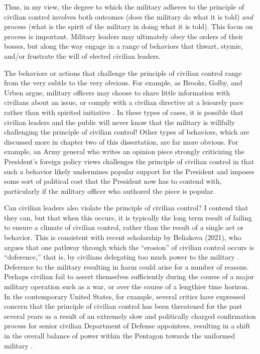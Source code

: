 \documentclass[
  12pt,
  oneside]{memoir}
\begin{document}
Thus, in my view, the degree to which the military adheres to the principle of civilian control involves both outcomes (does the military do what it is told) \emph{and} process (what is the spirit of the military in doing what it is told). This focus on process is important. Military leaders may ultimately obey the orders of their bosses, but along the way engage in a range of behaviors that thwart, stymie, and/or frustrate the will of elected civilian leaders.

The behaviors or actions that challenge the principle of civilian control range from the very subtle to the very obvious. For example, as Brooks, Golby, and Urben argue, military officers may choose to share little information with civilians about an issue, or comply with a civilian directive at a leisurely pace rather than with spirited initiative \autocite{brooks_crisis_2021}. In these types of cases, it is possible that civilian leaders and the public will never know that the military is willfully challenging the principle of civilian control! Other types of behaviors, which are discussed more in chapter two of this dissertation, are far more obvious. For example, an Army general who writes an opinion piece strongly criticizing the President's foreign policy views challenges the principle of civilian control in that such a behavior likely undermines popular support for the President and imposes some sort of political cost that the President now has to contend with, particularly if the military officer who authored the piece is popular.

Can civilian leaders also violate the principle of civilian control? I contend that they can, but that when this occurs, it is typically the long term result of failing to ensure a climate of civilian control, rather than the result of a single act or behavior. This is consistent with recent scholarship by Beliakova (2021), who argues that one pathway through which the ``erosion'' of civilian control occurs is ``deference,'' that is, by civilians delegating too much power to the military \autocite{beliakova_erosion_2021}. Deference to the military resulting in harm could arise for a number of reasons. Perhaps civilian fail to assert themselves sufficiently during the course of a major military operation such as a war, or over the course of a lengthier time horizon. In the contemporary United States, for example, several critics have expressed concern that the principle of civilian control has been threatened for the past several years as a result of an extremely slow and politically charged confirmation process for senior civilian Department of Defense appointees, resulting in a shift in the overall balance of power within the Pentagon towards the uniformed military \autocite{seligman_civilian_2020}.
\end{document}
